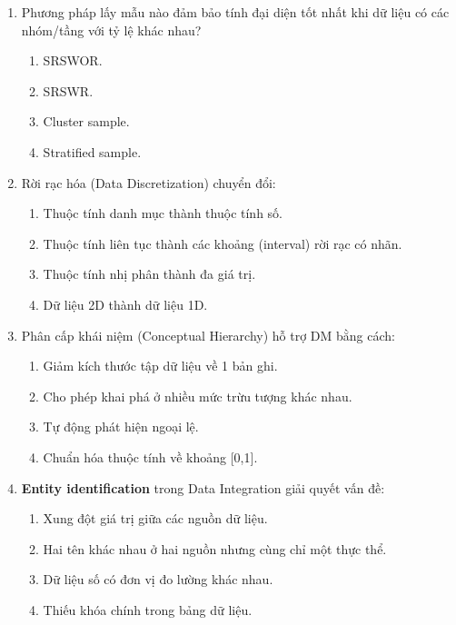 \documentclass[10pt]{article}
\begin{document}
\begin{enumerate}[leftmargin=*, label=\textbf{Câu \arabic*.}]
    \item Phương pháp lấy mẫu nào đảm bảo tính đại diện tốt nhất khi dữ liệu có các nhóm/tầng với tỷ lệ khác nhau?
    \begin{enumerate}[label=\Alph*.]
        \item SRSWOR.
        \item SRSWR.
        \item Cluster sample.
        \item Stratified sample.
    \end{enumerate}

    \item Rời rạc hóa (Data Discretization) chuyển đổi:
    \begin{enumerate}[label=\Alph*.]
        \item Thuộc tính danh mục thành thuộc tính số.
        \item Thuộc tính liên tục thành các khoảng (interval) rời rạc có nhãn.
        \item Thuộc tính nhị phân thành đa giá trị.
        \item Dữ liệu 2D thành dữ liệu 1D.
    \end{enumerate}

    \item Phân cấp khái niệm (Conceptual Hierarchy) hỗ trợ DM bằng cách:
    \begin{enumerate}[label=\Alph*.]
        \item Giảm kích thước tập dữ liệu về 1 bản ghi.
        \item Cho phép khai phá ở nhiều mức trừu tượng khác nhau.
        \item Tự động phát hiện ngoại lệ.
        \item Chuẩn hóa thuộc tính về khoảng [0,1].
    \end{enumerate}

    \item \textbf{Entity identification} trong Data Integration giải quyết vấn đề:
    \begin{enumerate}[label=\Alph*.]
        \item Xung đột giá trị giữa các nguồn dữ liệu.
        \item Hai tên khác nhau ở hai nguồn nhưng cùng chỉ một thực thể.
        \item Dữ liệu số có đơn vị đo lường khác nhau.
        \item Thiếu khóa chính trong bảng dữ liệu.
    \end{enumerate}


\end{enumerate}
\end{document}
